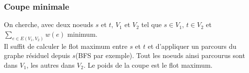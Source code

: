 \subsubsection{Coupe minimale}
On cherche, avec deux noeuds $s$ et $t$, $V_1$ et $V_2$ tel que $s\in V_1$, $t\in V_2$ et $\sum_{e \in E(V_1, V_2)} w(e)$ minimum.\\
Il suffit de calculer le flot maximum entre $s$ et $t$ et d'appliquer un parcours du graphe résiduel depuis $s$(BFS par exemple). Tout les noeuds ainsi parcourus sont dans $V_1$, les autres dans $V_2$. Le poids de la coupe est le flot maximum.